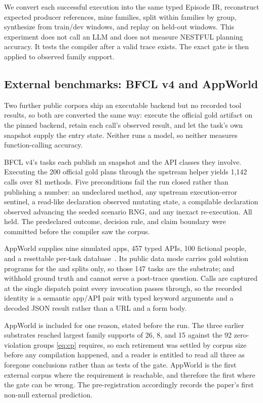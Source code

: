 We convert each successful execution into the same typed Episode IR, reconstruct
expected producer references, mine families, split within families by group, synthesize
from train/dev windows, and replay on held-out windows.  This experiment does not call an
LLM and does not measure NESTFUL planning accuracy.  It tests the compiler after a valid
trace exists.  The exact gate is then applied to observed family support.

\subsection{External benchmarks: BFCL v4 and AppWorld}
\label{sec:appworld-method}

Two further public corpora ship an executable backend but no recorded tool results, so both
are converted the same way: execute the official gold artifact on the pinned backend, retain
each call's observed result, and let the task's own snapshot supply the entry state. Neither
runs a model, so neither measures function-calling accuracy.

BFCL v4's  tasks each publish an  snapshot and
the API classes they involve. Executing the 200 official gold plans through the upstream
helper yields 1,142 calls over 81 methods. Five preconditions fail the run closed rather than
publishing a number: an undeclared method, any upstream execution-error sentinel, a read-like
declaration observed mutating state, a compilable declaration observed advancing the seeded
scenario RNG, and any inexact re-execution. All held. The predeclared outcome, decision rule,
and claim boundary were committed before the compiler saw the corpus.

AppWorld supplies nine simulated apps, 457 typed APIs, 100 fictional people, and a
resettable per-task database~\cite{trivedi2024appworld}. Its public  data mode
carries gold solution programs for the  and  splits only, so those 147
tasks are the substrate;  and  withhold ground truth
and cannot serve a post-trace question. Calls are captured at the single dispatch point every
 invocation passes through, so the recorded identity is a
semantic app/API pair with typed keyword arguments and a decoded JSON result rather than a
URL and a form body.

AppWorld is included for one reason, stated before the run. The three earlier substrates
reached largest family supports of 26, 8, and 15 against the 92 zero-violation groups
\eqref{eq:cp} requires, so each retirement was settled by corpus size before any compilation
happened, and a reader is entitled to read all three as foregone conclusions rather than as
tests of the gate. AppWorld is the first external corpus where the requirement is reachable,
and therefore the first where the gate can be wrong. The pre-registration accordingly records
the paper's first non-null external prediction.

